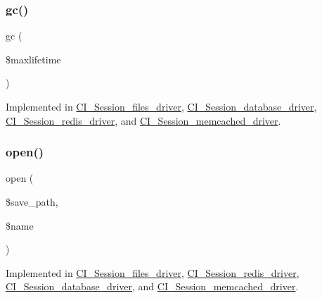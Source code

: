 \mbox{\label{interface_session_handler_interface_a57aff7ee0656d8aa75d545fb8b3ae35d}} 
\subsubsection{\texorpdfstring{gc()}{gc()}}
{\footnotesize\ttfamily gc (\begin{DoxyParamCaption}\item[{}]{\$maxlifetime }\end{DoxyParamCaption})}



Implemented in \mbox{\hyperlink{class_c_i___session__files__driver_a57aff7ee0656d8aa75d545fb8b3ae35d}{C\+I\+\_\+\+Session\+\_\+files\+\_\+driver}}, \mbox{\hyperlink{class_c_i___session__database__driver_a57aff7ee0656d8aa75d545fb8b3ae35d}{C\+I\+\_\+\+Session\+\_\+database\+\_\+driver}}, \mbox{\hyperlink{class_c_i___session__redis__driver_a57aff7ee0656d8aa75d545fb8b3ae35d}{C\+I\+\_\+\+Session\+\_\+redis\+\_\+driver}}, and \mbox{\hyperlink{class_c_i___session__memcached__driver_a57aff7ee0656d8aa75d545fb8b3ae35d}{C\+I\+\_\+\+Session\+\_\+memcached\+\_\+driver}}.

\mbox{\label{interface_session_handler_interface_a614b5cf3840833913c7a73260ed28e02}} 
\subsubsection{\texorpdfstring{open()}{open()}}
{\footnotesize\ttfamily open (\begin{DoxyParamCaption}\item[{}]{\$save\+\_\+path,  }\item[{}]{\$name }\end{DoxyParamCaption})}



Implemented in \mbox{\hyperlink{class_c_i___session__files__driver_a614b5cf3840833913c7a73260ed28e02}{C\+I\+\_\+\+Session\+\_\+files\+\_\+driver}}, \mbox{\hyperlink{class_c_i___session__redis__driver_a614b5cf3840833913c7a73260ed28e02}{C\+I\+\_\+\+Session\+\_\+redis\+\_\+driver}}, \mbox{\hyperlink{class_c_i___session__database__driver_a614b5cf3840833913c7a73260ed28e02}{C\+I\+\_\+\+Session\+\_\+database\+\_\+driver}}, and \mbox{\hyperlink{class_c_i___session__memcached__driver_a614b5cf3840833913c7a73260ed28e02}{C\+I\+\_\+\+Session\+\_\+memcached\+\_\+driver}}.

